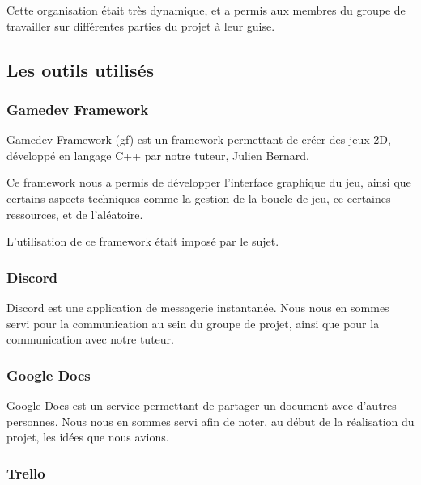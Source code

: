 \documentclass[10pt]{report}
\begin{document}
Cette organisation était très dynamique, et a permis aux membres du groupe de travailler sur différentes parties du projet à leur guise.

\subsection{Les outils utilisés}
\subsubsection{Gamedev Framework}

Gamedev Framework (gf) est un framework permettant de créer des jeux 2D, développé en langage C++ par notre
tuteur, Julien Bernard.

Ce framework nous a permis de développer l'interface graphique du jeu, ainsi que certains aspects techniques comme
la gestion de la boucle de jeu, ce certaines ressources, et de l'aléatoire.

L'utilisation de ce framework était imposé par le sujet.

\subsubsection{Discord}

Discord est une application de messagerie instantanée.
Nous nous en sommes servi pour la communication au sein du groupe de projet, ainsi que pour la communication avec
notre tuteur.

\subsubsection{Google Docs} %

Google Docs est un service permettant de partager un document avec d'autres personnes.
Nous nous en sommes servi afin de noter, au début de la réalisation du projet, les idées que nous avions.

\subsubsection{Trello}
\end{document}
